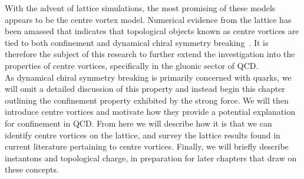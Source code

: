 With the advent of lattice simulations, the most promising of these models appears to be the centre vortex model. Numerical evidence from the lattice has been amassed that indicates that topological objects known as centre vortices are tied to both confinement and dynamical chiral symmetry breaking~\cite{Biddle:2018dtc,Faber:1997rp,Langfeld:1998cz,Bowman:2008qd,Trewartha:2015ida,Trewartha:2015nna,Trewartha:2017ive,DelDebbio:1996lih,Greensite:2003bk,DelDebbio:1998luz,OMalley:2011aa,Langfeld:2003ev,Bowman:2010zr}. It is therefore the subject of this research to further extend the investigation into the properties of centre vortices, specifically in the gluonic sector of QCD.\\

As dynamical chiral symmetry breaking is primarily concerned with quarks, we will omit a detailed discussion of this property and instead begin this chapter outlining the confinement property exhibited by the strong force. We will then introduce centre vortices and motivate how they provide a potential explanation for confinement in QCD. From here we will describe how it is that we can identify centre vortices on the lattice, and survey the lattice results found in current literature pertaining to centre vortices. Finally, we will briefly describe instantons and topological charge, in preparation for later chapters that draw on these concepts.  

